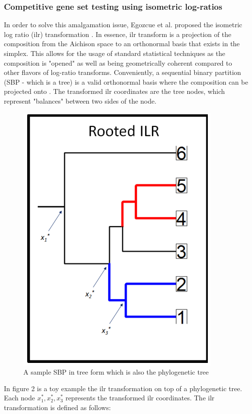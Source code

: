 \documentclass{article}
\begin{document}
\subsubsection{Competitive gene set testing using isometric log-ratios}
In order to solve this amalgamation issue, Egozcue et al. proposed the isometric log ratio (ilr) transformation \cite{egozcue2003}. In essence, ilr transform is a projection of the composition from the Aichison space to an orthonormal basis that exists in the simplex. This allows for the usage of standard statistical techniques as the composition is "opened" as well as being geometrically coherent compared to other flavors of log-ratio transforms. Conveniently, a sequential binary partition (SBP - which is a tree) is a valid orthonormal basis where the composition can be projected onto \cite{egozcue2003}. The transformed ilr coordinates are the tree nodes, which represent "balances" between two sides of the node. 
\begin{figure}[!htb]
    \centering
    \includegraphics[scale = 0.5]{phylogeny_demonstration.png}
    \caption{A sample SBP in tree form which is also the phylogenetic tree}
    \label{fig:phylogeny_demonstration}
\end{figure}
In figure 2 is a toy example the ilr transformation on top of a phylogenetic tree. Each node $x_1^*, x_2^*, x_3^*$ represents the transformed ilr coordinates. The ilr transformation is defined as follows:
\end{document}
